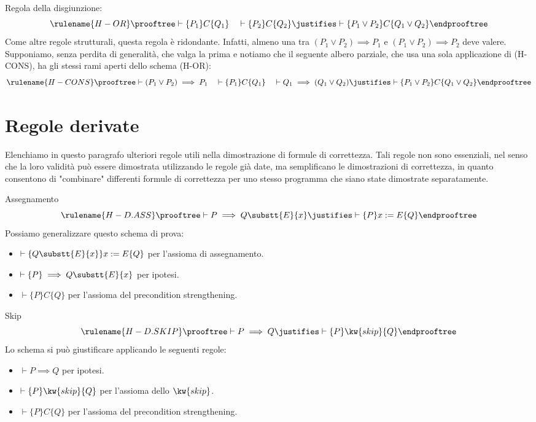 Regola della disgiunzione:
\[
  \rulename {H-OR}
  \prooftree
    \vdash \{P_1\} C\{Q_1\}
    \quad
    \vdash \{P_2\} C\{Q_2\}
   \justifies
     \vdash \{P_1 \lor P_2\}C\{Q_1 \lor Q_2\}
  \endprooftree
\]
Come altre regole strutturali, questa regola è ridondante.
Infatti, almeno una tra $(P_1 \lor P_2) \implies P_1$
e $(P_1 \lor P_2) \implies P_2$ deve valere.
Supponiamo, senza perdita di generalità,
che valga la prima e notiamo che il seguente albero parziale, che usa
una sola applicazione di (H-CONS), ha gli
stessi rami aperti dello schema (H-OR):
\[
  \rulename {H-CONS}
  \prooftree
    \vdash (P_1 \lor P_2) \implies P_1
    \quad
    \vdash \{P_1\} C\{Q_1\}
    \quad
    \vdash Q_1 \implies (Q_1 \lor Q_2)
   \justifies
     \vdash \{P_1 \lor P_2\}C\{Q_1 \lor Q_2\}
  \endprooftree
\]

\section{Regole derivate}
Elenchiamo in questo paragrafo ulteriori regole utili nella dimostrazione di formule di correttezza. Tali
regole non sono essenziali, nel senso che la loro validità può essere dimostrata utilizzando le regole già
date, ma semplificano le dimostrazioni di correttezza, in quanto consentono di "combinare" differenti
formule di correttezza per uno stesso programma che siano state dimostrate separatamente.

Assegnamento
\[
  \rulename {H-D.ASS}
  \prooftree
    \vdash P \implies Q\substt{E}{x}
   \justifies
     \vdash \{P\}x:=E\{Q\}
  \endprooftree
\]
Possiamo generalizzare questo schema di prova:
\begin{itemize}
  \item
    $\vdash \{Q\substt{E}{x}\} x :=E \{Q\}$ per l'assioma di assegnamento.
  \item
    $\vdash \{P\} \implies Q\substt{E}{x}$ per ipotesi.
  \item
    $\vdash \{P\}C\{Q\}$ per l'assioma del precondition strengthening.
\end{itemize}

Skip
\[
  \rulename {H-D.SKIP}
  \prooftree
    \vdash P \implies Q
  \justifies
    \vdash \{P\}\kw{skip}\{Q\}
  \endprooftree
\]
Lo schema si può giustificare applicando le seguenti regole:
\begin{itemize}
  \item
    $\vdash P \implies Q$ per ipotesi.
  \item
    $\vdash \{P\}\kw{skip}\{Q\}$ per l'assioma dello $\kw{skip}$.
  \item
    $\vdash \{P\}C\{Q\}$ per l'assioma del precondition strengthening.
\end{itemize}

